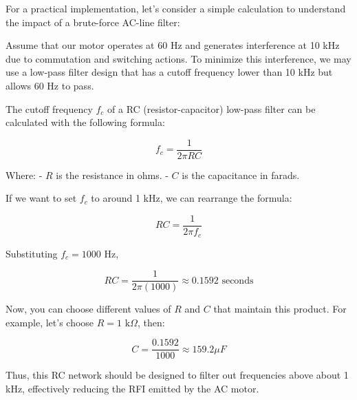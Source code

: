 For a practical implementation, let's consider a simple calculation to understand the impact of a brute-force AC-line filter:

Assume that our motor operates at 60 Hz and generates interference at 10 kHz due to commutation and switching actions. To minimize this interference, we may use a low-pass filter design that has a cutoff frequency lower than 10 kHz but allows 60 Hz to pass.

The cutoff frequency \( f_c \) of a RC (resistor-capacitor) low-pass filter can be calculated with the following formula:

\[
f_c = \frac{1}{2\pi RC}
\]

Where:
- \( R \) is the resistance in ohms.
- \( C \) is the capacitance in farads.

If we want to set \( f_c \) to around 1 kHz, we can rearrange the formula:

\[
RC = \frac{1}{2\pi f_c}
\]

Substituting \( f_c = 1000 \) Hz,

\[
RC = \frac{1}{2\pi(1000)} \approx 0.1592 \text{ seconds}
\]

Now, you can choose different values of \( R \) and \( C \) that maintain this product. For example, let’s choose \( R = 1 \text{ k}\Omega \), then:

\[
C = \frac{0.1592}{1000} \approx 159.2 \mu F
\]

Thus, this RC network should be designed to filter out frequencies above about 1 kHz, effectively reducing the RFI emitted by the AC motor.




